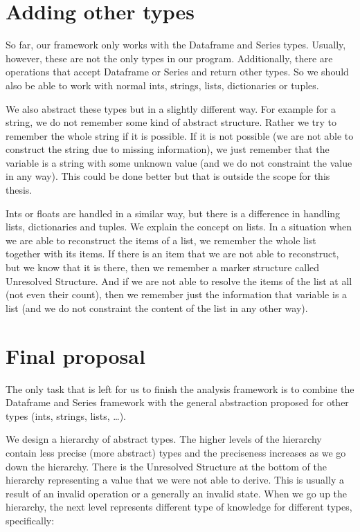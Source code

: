 \section{Adding other types}

So far, our framework only works with the Dataframe and Series types.
Usually, however, these are not the only types in our program.
Additionally, there are operations that accept Dataframe or Series and return other types.
So we should also be able to work with normal ints, strings, lists, dictionaries or tuples.

We also abstract these types but in a slightly different way.
For example for a string, we do not remember some kind of abstract structure.
Rather we try to remember the whole string if it is possible.
If it is not possible (we are not able to construct the string due to missing information), we just remember that the
variable is a string with some unknown value (and we do not constraint the value in any way).
This could be done better but that is outside the scope for this thesis.

Ints or floats are handled in a similar way, but there is a difference in handling lists, dictionaries and tuples.
We explain the concept on lists.
In a situation when we are able to reconstruct the items of a list, we remember the whole list together with its items.
If there is an item that we are not able to reconstruct, but we know that it is there, then we remember a marker
structure called Unresolved Structure.
And if we are not able to resolve the items of the list at all (not even their count), then we remember just the
information that variable is a list (and we do not constraint the content of the list in any other way).


\section{Final proposal}

The only task that is left for us to finish the analysis framework is to combine the Dataframe and Series framework
with the general abstraction proposed for other types (ints, strings, lists, \ldots).

We design a hierarchy of abstract types.
The higher levels of the hierarchy contain less precise (more abstract) types and the preciseness increases as we go
down the hierarchy.
There is the Unresolved Structure at the bottom of the hierarchy representing a value that we were not able to derive.
This is usually a result of an invalid operation or a generally an invalid state.
When we go up the hierarchy, the next level represents different type of knowledge for different types, specifically:

